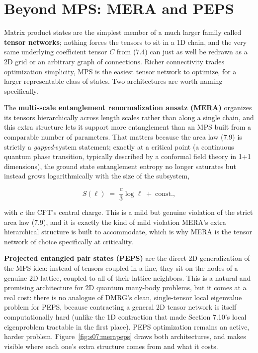 \section{Beyond MPS: MERA and PEPS}

Matrix product states are the simplest member of a much larger family called \textbf{tensor networks};
nothing forces the tensors to sit in a 1D chain, and the very same underlying coefficient tensor $C$
from (7.4) can just as well be redrawn as a 2D grid or an arbitrary graph of connections. Richer
connectivity trades optimization simplicity, MPS is the easiest tensor network to optimize, for a
larger representable class of states. Two architectures are worth naming specifically.

The \textbf{multi-scale entanglement renormalization ansatz (MERA)} organizes its tensors hierarchically
across length scales rather than along a single chain, and this extra structure lets it support more
entanglement than an MPS built from a comparable number of parameters. That matters because the area
law (7.9) is strictly a \emph{gapped}-system statement; exactly at a critical point (a continuous quantum
phase transition, typically described by a conformal field theory in 1+1 dimensions), the ground state
entanglement entropy no longer saturates but instead grows logarithmically with the size of the
subsystem,

\begin{equation}
S(\ell) \;=\; \frac{c}{3}\log \ell \;+\; \text{const.},
\end{equation}

with $c$ the CFT's central charge. This is a mild but genuine violation of the strict area law (7.9),
and it is exactly the kind of mild violation MERA's extra hierarchical structure is built to
accommodate, which is why MERA is the tensor network of choice specifically at criticality.

\textbf{Projected entangled pair states (PEPS)} are the direct 2D generalization of the MPS idea: instead of
tensors coupled in a line, they sit on the nodes of a genuine 2D lattice, coupled to all of their
lattice neighbors. This is a natural and promising architecture for 2D quantum many-body problems, but
it comes at a real cost: there is no analogue of DMRG's clean, single-tensor local eigenvalue problem
for PEPS, because contracting a general 2D tensor network is itself computationally hard (unlike the 1D
contraction that made Section 7.10's local eigenproblem tractable in the first place). PEPS
optimization remains an active, harder problem. Figure~\ref{fig:s07:merapeps} draws both
architectures, and makes visible where each one's extra structure comes from and what it costs.

